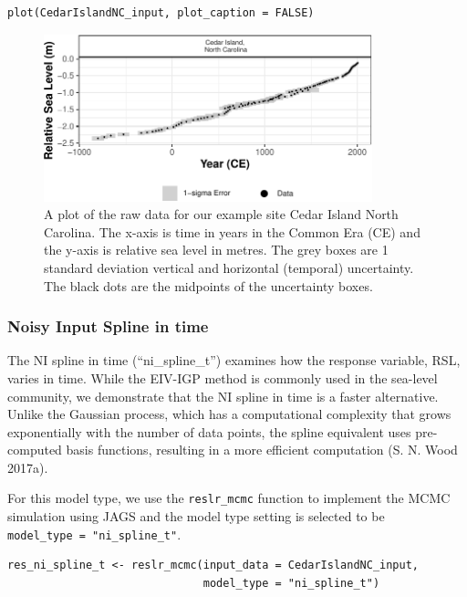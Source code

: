 \begin{verbatim}
plot(CedarIslandNC_input, plot_caption = FALSE)
\end{verbatim}

\begin{figure}

{\centering \includegraphics[width=360px]{reslr_files/figure-latex/plotdata-1} 

}

\caption{A plot of the raw data for our example site Cedar Island North Carolina. The x-axis is time in years in the Common Era (CE) and the y-axis is relative sea level in metres. The grey boxes are 1 standard deviation vertical and horizontal (temporal) uncertainty. The black dots are the midpoints of the uncertainty boxes.}\label{fig:plotdata}
\end{figure}
\normalsize

\hypertarget{nisplinet}{%
\subsubsection{Noisy Input Spline in time}\label{nisplinet}}

The NI spline in time (``ni\_spline\_t'') examines how the response variable, RSL, varies in time. While the EIV-IGP method is commonly used in the sea-level community, we demonstrate that the NI spline in time is a faster alternative. Unlike the Gaussian process, which has a computational complexity that grows exponentially with the number of data points, the spline equivalent uses pre-computed basis functions, resulting in a more efficient computation (S. N. Wood 2017a).

For this model type, we use the \texttt{reslr\_mcmc} function to implement the MCMC simulation using JAGS and the model type setting is selected to be \texttt{model\_type\ =\ "ni\_spline\_t"}.
\scriptsize

\begin{verbatim}
res_ni_spline_t <- reslr_mcmc(input_data = CedarIslandNC_input,
                              model_type = "ni_spline_t")
\end{verbatim}

